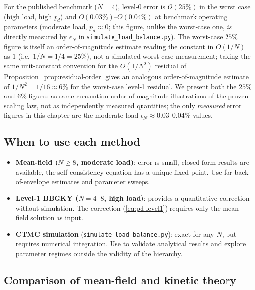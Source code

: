 \documentclass[11pt,a4paper]{article}
\newcommand{\pd}{p_d}
\begin{document}
For the published benchmark ($N=4$), level-0 error is $O(25\%)$ in the
worst case (high load, high $\pd$) and $O(0.03\%)$--$O(0.04\%)$ at
benchmark operating parameters (moderate load, $\pd \approx 0$; this
figure, unlike the worst-case one, \emph{is} directly measured by
$\epsilon_N$ in \texttt{simulate\_load\_balance.py}). The worst-case
$25\%$ figure is itself an order-of-magnitude estimate reading the
constant in $O(1/N)$ as $1$ (i.e.\ $1/N = 1/4 = 25\%$), not a simulated
worst-case measurement; taking the same unit-constant convention for
the $O(1/N^2)$ residual of Proposition~\ref{prop:residual-order} gives
an analogous order-of-magnitude estimate of $1/N^2 = 1/16 \approx 6\%$
for the worst-case level-1 residual. We present both the $25\%$ and
$6\%$ figures as same-convention order-of-magnitude illustrations of
the proven scaling law, not as independently measured quantities;
the only \emph{measured} error figures in this chapter are the
moderate-load $\epsilon_N \approx 0.03$--$0.04\%$ values.

\subsection{When to use each method}

\begin{itemize}
  \item \textbf{Mean-field ($N \geq 8$, moderate load)}: error is small,
        closed-form results are available, the self-consistency equation
        has a unique fixed point.  Use for back-of-envelope estimates and
        parameter sweeps.

  \item \textbf{Level-1 BBGKY ($N=4$--$8$, high load)}: provides
        a quantitative correction without simulation.  The correction
        (\ref{eq:pd-level1}) requires only the mean-field solution as input.

  \item \textbf{CTMC simulation} (\texttt{simulate\_load\_balance.py}):
        exact for any $N$, but requires numerical integration.
        Use to validate analytical results and explore parameter regimes
        outside the validity of the hierarchy.
\end{itemize}

\subsection{Comparison of mean-field and kinetic theory}
\end{document}
